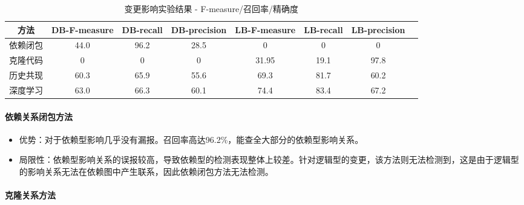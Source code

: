 \begin{table}[htbp]
\caption{变更影响实验结果 - F-measure/召回率/精确度}
\vspace{0.5em}\centering\wuhao
\begin{tabular}{cccccccc}
\toprule
方法 & DB-F-measure & DB-recall & DB-precision & LB-F-measure & LB-recall & LB-precision  \\
\midrule
依赖闭包 & 44.0 & 96.2 & 28.5 & 0 & 0 & 0 \\
克隆代码 & 0 & 0 &  0 & 31.95 & 19.1 & 97.8 \\
历史共现 & 60.3 & 65.9 & 55.6 & 69.3 & 81.7 & 60.2 \\
深度学习 & 63.0 & 66.3 & 60.1 & 74.4 & 83.4 & 67.2 \\
\bottomrule
\end{tabular}
\end{table}


\paragraph{依赖关系闭包方法}

\begin{itemize}

    \item 优势：对于依赖型影响几乎没有漏报。召回率高达96.2\%，能查全大部分的依赖型影响关系。

    \item 局限性：依赖型影响关系的误报较高，导致依赖型的检测表现整体上较差。针对逻辑型的变更，该方法则无法检测到，这是由于逻辑型的影响关系无法在依赖图中产生联系，因此依赖闭包方法无法检测。
    
\end{itemize}


\paragraph{克隆关系方法}

